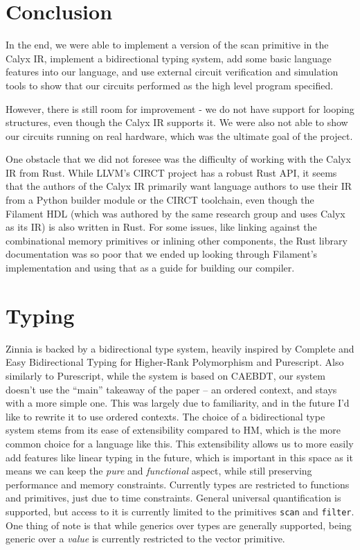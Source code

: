 \documentclass[12pt]{article}
\begin{document}
\section{Conclusion}
In the end, we were able to implement a version of the scan primitive in the Calyx IR, implement a bidirectional
typing system, add some basic language features into our language, and use external circuit verification and simulation
tools to show that our circuits performed as the high level program specified.

However, there is still room for improvement - we do not have support for looping structures, even though the Calyx IR supports
it. We were also not able to show our circuits running on real hardware, which was the ultimate goal of the project.

One obstacle that we did not foresee was the difficulty of working with the Calyx IR from Rust. While LLVM's CIRCT project
has a robust Rust API, it seems that the authors of the Calyx IR primarily want language authors to use their IR from
a Python builder module or the CIRCT toolchain, even though the Filament HDL (which was authored by the same research
group and uses Calyx as its IR) is also written in Rust. For some issues, like linking against the combinational memory
primitives or inlining other components, the Rust library documentation was so poor that we ended up looking through
Filament's implementation and using that as a guide for building our compiler.

\section{Typing}
Zinnia is backed by a bidirectional type system, heavily inspired by Complete and Easy Bidirectional Typing for Higher-Rank Polymorphism and Purescript. Also similarly to Purescript, while the system is based on CAEBDT, our system doesn't use the ``main'' takeaway of the paper -- an ordered context, and stays with a more simple one. This was largely due to familiarity, and in the future I'd like to rewrite it to use ordered contexts. The choice of a bidirectional type system stems from its ease of extensibility compared to HM, which is the more common choice for a language like this. This extensibility allows us to more easily add features like linear typing in the future, which is important in this space as it means we can keep the \textit{pure} and \textit{functional} aspect, while still preserving performance and memory constraints. Currently types are restricted to functions and primitives, just due to time constraints. General universal quantification is supported, but access to it is currently limited to the primitives \texttt{scan} and \texttt{filter}. One thing of note is that while generics over types are generally supported, being generic over a \textit{value} is currently restricted to the vector primitive.
\end{document}
